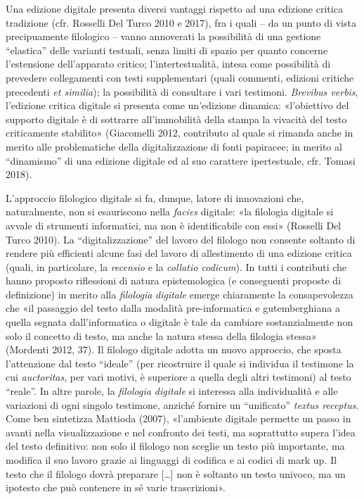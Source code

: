 \documentclass[
  b5paper,
  twoside,
  12pt,
  chapterprefix=false,
  bibliography=totocnumbered,
  parskip=false]{scrbook}
\begin{document}
Una edizione digitale presenta diversi vantaggi rispetto ad una edizione
critica tradizione (cfr. Rosselli Del Turco 2010 e 2017), fra i quali --
da un punto di vista precipuamente filologico -- vanno annoverati la
possibilità di una gestione \enquote{elastica} delle varianti testuali, senza
limiti di spazio per quanto concerne l'estensione dell'apparato critico;
l'intertestualità, intesa come possibilità di prevedere collegamenti con
testi supplementari (quali commenti, edizioni critiche precedenti \emph{et
similia}); la possibilità di consultare i vari testimoni. \emph{Brevibus
verbis}, l'edizione critica digitale si presenta come un'edizione
dinamica: «l'obiettivo del supporto digitale è di sottrarre
all'immobilità della stampa la vivacità del testo criticamente
stabilito» (Giacomelli 2012, contributo al quale si rimanda anche in
merito alle problematiche della digitalizzazione di fonti papiracee; in
merito al \enquote{dinamismo} di una edizione digitale ed al suo carattere
ipertestuale, cfr. Tomasi 2018).

L'approccio filologico digitale si fa, dunque, latore di innovazioni
che, naturalmente, non si esauriscono nella \emph{facies} digitale: «la
filologia digitale si avvale di strumenti informatici, ma non è
identificabile con essi» (Rosselli Del Turco 2010). La
\enquote{digitalizzazione} del lavoro del filologo non consente soltanto di
rendere più efficienti alcune fasi del lavoro di allestimento di una
edizione critica (quali, in particolare, la \emph{recensio} e la \emph{collatio
codicum}). In tutti i contributi che hanno proposto riflessioni di
natura epistemologica (e conseguenti proposte di definizione) in merito
alla \emph{filologia} \emph{digitale} emerge chiaramente la consapevolezza che «il
passaggio del testo dalla modalità pre-informatica e gutemberghiana a
quella segnata dall'informatica o digitale è tale da cambiare
sostanzialmente non solo il concetto di testo, ma anche la natura stessa
della filologia stessa» (Mordenti 2012, 37). Il filologo digitale adotta
un nuovo approccio, che sposta l'attenzione dal testo \enquote{ideale} (per
ricostruire il quale si individua il testimone la cui \emph{auctoritas}, per
vari motivi, è superiore a quella degli altri testimoni) al testo
\enquote{reale}. In altre parole, la \emph{filologia digitale} si interessa alla
individualità e alle variazioni di ogni singolo testimone, anziché
fornire un \enquote{unificato} \emph{textus receptus}. Come ben sintetizza Mattioda
(2007), «l'ambiente digitale permette un passo in avanti nella
visualizzazione e nel confronto dei testi, ma soprattutto supera l'idea
del testo definitivo: non solo il filologo non sceglie un testo più
importante, ma modifica il suo lavoro grazie ai linguaggi di codifica e
ai codici di mark up\emph{.} Il testo che il filologo dovrà preparare
{[}\ldots{]} non è soltanto un testo univoco, ma un ipotesto che può
contenere in sé varie trascrizioni».
\end{document}
